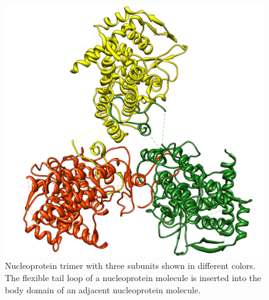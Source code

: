 \begin{figure}
\centering
\includegraphics[width=\linewidth]{../influenza/2IQH.png}
\caption{Nucleoprotein trimer with three subunits shown in different colors. The flexible tail loop of a nucleoprotein molecule is inserted into the body domain of an adjacent nucleoprotein molecule.}
\label{influenza:2IQH}
\end{figure}

